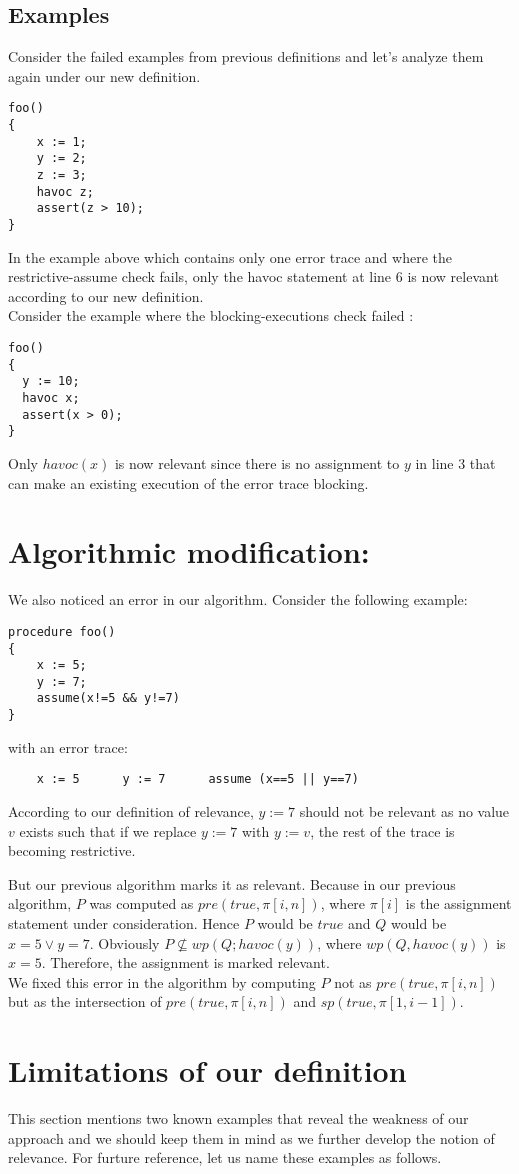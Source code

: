 \documentclass{article}
\begin{document}
\subsection{Examples}
Consider the failed examples from previous definitions and let's analyze them again under our new definition.
\begin{lstlisting}
foo()
{
	x := 1;
	y := 2;
	z := 3;
	havoc z;
	assert(z > 10);
}
\end{lstlisting}
In the example above which contains only one error trace and where the restrictive-assume check fails, only the havoc statement at line 6 is now relevant according to our new definition. \\
Consider the example where the blocking-executions check failed :
\begin{lstlisting}
foo()
{
  y := 10;
  havoc x;
  assert(x > 0);
}
\end{lstlisting}
Only $havoc(x)$ is now relevant since there is no assignment to $y$ in line 3 that can make an existing execution of the error trace blocking.

\section{Algorithmic modification:}
We also noticed an error in our algorithm. Consider the following example:
\begin{lstlisting}
procedure foo()
{
	x := 5;
	y := 7;
	assume(x!=5 && y!=7)
}
\end{lstlisting}
with an error trace:
\begin{lstlisting}
	x := 5		y := 7		assume (x==5 || y==7) 
\end{lstlisting}
According to our definition of relevance, $y:=7$ should not be relevant as no value $v$ exists such that if we replace $y:=7$ with $y:=v$, the rest of the trace is becoming restrictive. 

But our previous algorithm marks it as relevant. Because in our previous algorithm, $P$ was computed as $pre(true, \pi[i,n])$, where $\pi[i]$ is the assignment statement under consideration. Hence $P$ would be $true$ and $Q$ would be $x=5 \vee y=7$. Obviously $P \not \subseteq wp(Q; havoc(y))$, where $wp(Q, havoc(y))$ is $x=5$. Therefore, the assignment is marked relevant. \\
We fixed this error in the algorithm by computing $P$ not as $pre(true, \pi[i,n])$ but as the intersection of $pre(true, \pi[i,n])$ and $sp(true, \pi[1,i-1])$.

\section{Limitations of our definition}
This section mentions two known examples that reveal the weakness of our approach and we should keep them in mind as we further develop the notion of relevance. For furture reference, let us name these examples as follows.
\end{document}
